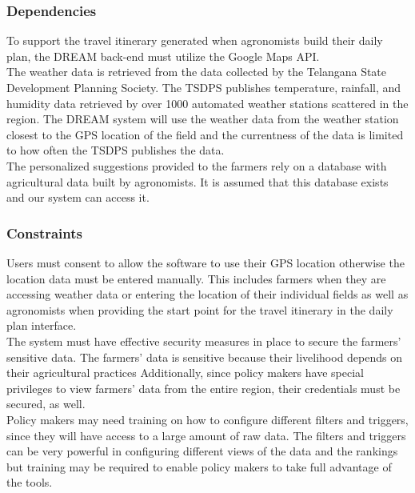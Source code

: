 \subsubsection{Dependencies}
\begin{flushleft}
To support the travel itinerary generated when agronomists build their daily plan, the DREAM back-end must utilize the Google Maps API. \\
\smallskip 
The weather data is retrieved from the data collected by the Telangana State Development Planning Society. The TSDPS publishes temperature, rainfall, and humidity data retrieved by over 1000 automated weather stations scattered in the region. The DREAM system will use the weather data from the weather station closest to the GPS location of the field and the currentness of the data is limited to how often the TSDPS publishes the data. \\
\smallskip
The personalized suggestions provided to the farmers rely on a database with agricultural data built by agronomists. It is assumed that this database exists and our system can access it. \\
\end{flushleft}

\subsubsection{Constraints}
\begin{flushleft}
Users must consent to allow the software to use their GPS location otherwise the location data must be entered manually. This includes farmers when they are accessing weather data or entering the location of their individual fields as well as agronomists when providing the start point for the travel itinerary in the daily plan interface. \\
\smallskip
The system must have effective security measures in place to secure the farmers' sensitive data. The farmers' data is sensitive because their livelihood depends on their agricultural practices Additionally, since policy makers have special privileges to view farmers' data from the entire region, their credentials must be secured, as well. \\
\smallskip
Policy makers may need training on how to configure different filters and triggers, since they will have access to a large amount of raw data. The filters and triggers can be very powerful in configuring different views of the data and the rankings but training may be required to enable policy makers to take full advantage of the tools. 
\end{flushleft}
